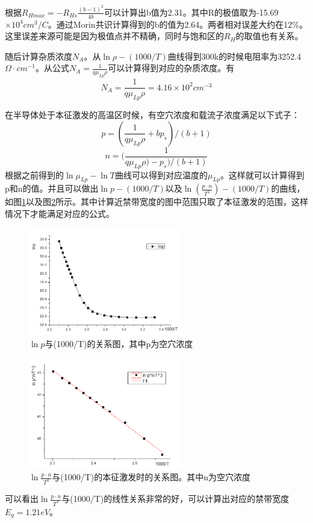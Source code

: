 \documentclass[aps,pre,12pt,preprint,onecolumn,showpacs,showkeys,UTF8]{revtex4-1}
\begin{document}
根据$R_{Hmax}=-R_{Hs}\frac{(b-1)^2}{4b}$可以计算出b值为2.31。其中R的极值取为-15.69$\times10^4cm^3/C$。通过Morin共识计算得到的b的值为2.64。两者相对误差大约在12\%。这里误差来源可能是因为极值点并不精确，同时与饱和区的$R_H$的取值也有关系。

随后计算杂质浓度$N_A$。从$\ln\rho-(1000/T)$曲线得到300k的时候电阻率为3252.4$\Omega\cdot cm^{-1}$。从公式$N_A=\frac{1}{q\mu_{Lp}\rho}$可以计算得到对应的杂质浓度。有
\begin{equation}
	N_A=\frac{1}{q\mu_{Lp}\rho}=4.16\times10^2cm^{-3}
\end{equation}

在半导体处于本征激发的高温区时候，有空穴浓度和载流子浓度满足以下式子：
\begin{equation}
	p=(\frac{1}{q\mu_{Lp}\rho}+bp_s)/(b+1)
\end{equation}
\begin{equation}
	n=(\frac{1}{q\mu_{Lp}\rho)-p_s)/(b+1)}
\end{equation}
根据之前得到的$\ln \mu_{Lp}-\ln T$曲线可以得到对应温度的$\mu_{Lp}$。这样就可以计算得到p和n的值。并且可以做出$\ln p-(1000/T)$以及$\ln(\frac{p\cdot n}{T^3})-(1000/T)$的曲线，如图\ref{g:4}以及图\ref{g:5}所示。其中计算近禁带宽度的图中范围只取了本征激发的范围，这样情况下才能满足对应的公式。
\begin{figure}[ht]
	\begin{center}
		\includegraphics[width=0.6\textwidth]{pic4.png}
		\caption{\label{g:4}$\ln p$与(1000/T)的关系图，其中p为空穴浓度}
	\end{center}
\end{figure}
\begin{figure}[ht]
	\begin{center}
		\includegraphics[width=0.6\textwidth]{pic5.png}
		\caption{\label{g:5}$\ln \frac{p\cdot n}{T^3}$与(1000/T)的本征激发时的关系图。其中n为空穴浓度}
	\end{center}
\end{figure}
可以看出$\ln \frac{p\cdot n}{T^3}$与(1000/T)的线性关系非常的好，可以计算出对应的禁带宽度$E_g=1.21eV$。
\end{document}
